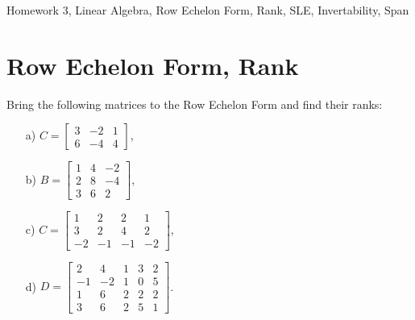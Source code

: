  \begin{center}\begin{large} Homework 3, Linear Algebra, Row Echelon Form, Rank, SLE, Invertability, Span\end{large}\end{center}
 \bigskip

\tableofcontents

\section{Row Echelon Form, Rank}
\begin{problem}%
    Bring the following matrices to the Row Echelon Form and find their ranks:

    \begin{enumerate}
        \item[a) ] $C=\begin{bmatrix}3&-2&1\\6&-4&4\end{bmatrix}$,
        
        \item[b) ] $B=\begin{bmatrix}1&4&-2\\2&8&-4\\3&6&2\end{bmatrix}$,
        
        \item[c) ] $C=\begin{bmatrix}1&2&2&1\\3&2&4&2\\-2&-1&-1&-2\end{bmatrix}$,
        
        \item[d) ] $D=\begin{bmatrix}2&4&1&3&2\\-1&-2&1&0&5\\1&6&2&2&2\\3&6&2&5&1\end{bmatrix}$.
    \end{enumerate}
\end{problem}

